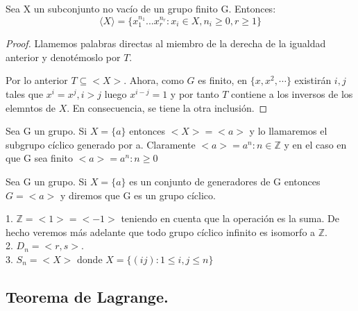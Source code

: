 \begin{nprop}
Sea X un subconjunto no vacío de un grupo finito G. Entonces: $$\langle X \rangle = \{x_1^{n_1}...x_r^{n_r}:x_i \in X,n_i \ge 0,r \ge 1\}$$
\end{nprop}
\begin{proof}
Llamemos palabras directas al miembro de la derecha de la igualdad anterior y denotémoslo por $T$. 

Por lo anterior $T \subseteq <X>$. Ahora, como $G$ es finito, en $\{x,x^2,\cdots\}$ existirán $i,j$ tales que $x^i = x^j, i > j$ luego $x^{i-j} = 1$ y por tanto $T$ contiene a los inversos de los elemntos de $X$. En consecuencia, se tiene la otra inclusión.
\end{proof}

\begin{ndef}
Sea G un grupo. Si $X = \{a\}$ entonces $<X> = <a>$ y lo llamaremos el subgrupo cíclico generado por a. Claramente $<a> = {a^n : n \in \mathbb{Z}}$ y en el caso en que G sea finito $<a> = {a^n : n \ge 0}$
\end{ndef}

\begin{ndef}
Sea G un grupo. Si $X = \{a\}$ es un conjunto de generadores de G entonces $G = <a>$ y diremos que G es un grupo cíclico.
\end{ndef}

\begin{ejemplo}
1. $\mathbb{Z} = <1> = <-1>$ teniendo en cuenta que la operación es la suma. De hecho veremos más adelante que todo grupo cíclico infinito es isomorfo a $\mathbb{Z}$.\\
2. $D_n = <r,s>$. \\
3. $S_n = <X>$ donde $X = \{(ij):1 \le i,j \le n\}$
\end{ejemplo}

\subsection{Teorema de Lagrange.}

